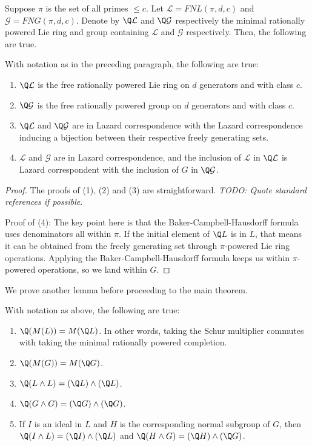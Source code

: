 Suppose $\pi$ is the set of all primes $\le c$. Let $\mathcal{L} =
FNL(\pi,d,c)$ and $\mathcal{G} = FNG(\pi,d,c)$. Denote by $\Q
\mathcal{L}$ and $\Q \mathcal{G}$ respectively the minimal rationally powered
Lie ring and group containing $\mathcal{L}$ and $\mathcal{G}$ respectively. Then, the
following are true.

\begin{lemma}
  With notation as in the preceding paragraph, the following are true:

  \begin{enumerate}
  \item $\Q \mathcal{L}$ is the free rationally powered Lie ring on $d$
    generators and with class $c$.
  \item $\Q \mathcal{G}$ is the free rationally powered group on $d$ generators
    and with class $c$.
  \item $\Q \mathcal{L}$ and $\Q \mathcal{G}$ are in Lazard correspondence with the Lazard
    correspondence inducing a bijection between their respective
    freely generating sets.
  \item $\mathcal{L}$ and $\mathcal{G}$ are in Lazard correspondence, and the inclusion of
    $\mathcal{L}$ in $\Q \mathcal{L}$ is Lazard correspondent with the inclusion of $G$ in
    $\Q \mathcal{G}$.
  \end{enumerate}
\end{lemma}

\begin{proof}
  The proofs of (1), (2) and (3) are straightforward. {\em TODO: Quote
    standard references if possible}.

  Proof of (4): The key point here is that the
  Baker-Campbell-Hausdorff formula uses denominators all within
  $\pi$. If the initial element of $\Q L$ is in $L$, that means it can
  be obtained from the freely generating set through $\pi$-powered Lie
  ring operations. Applying the Baker-Campbell-Hausdorff formula keeps
  us within $\pi$-powered operations, so we land within $G$.
\end{proof}

We prove another lemma before proceeding to the main theorem.

\begin{lemma}
  With notation as above, the following are true:

  \begin{enumerate}
  \item $\Q(M(L)) = M(\Q L)$. In other words, taking the Schur
    multiplier commutes with taking the minimal rationally powered
    completion.
  \item $\Q(M(G)) = M(\Q G)$.
  \item $\Q(L \wedge L) = (\Q L) \wedge (\Q L)$.
  \item $\Q(G \wedge G) = (\Q G) \wedge (\Q G)$.
  \item If $I$ is an ideal in $L$ and $H$ is the corresponding normal
    subgroup of $G$, then $\Q(I \wedge L) = (\Q I) \wedge (\Q L)$ and
    $\Q(H \wedge G) = (\Q H) \wedge (\Q G)$.
  \end{enumerate}
\end{lemma}

